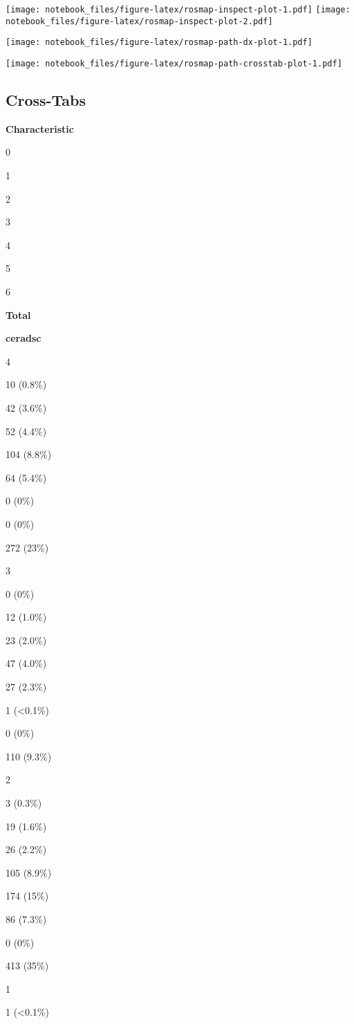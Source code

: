 \documentclass[]{book}
\begin{document}
\texttt{[image: notebook\_files/figure-latex/rosmap-inspect-plot-1.pdf]} \texttt{[image: notebook\_files/figure-latex/rosmap-inspect-plot-2.pdf]}

\texttt{[image: notebook\_files/figure-latex/rosmap-path-dx-plot-1.pdf]}

\texttt{[image: notebook\_files/figure-latex/rosmap-path-crosstab-plot-1.pdf]}

\hypertarget{cross-tabs-1}{%
\subsection{Cross-Tabs}\label{cross-tabs-1}}

\textbf{Characteristic}

0

1

2

3

4

5

6

\textbf{Total}

\textbf{ceradsc}

4

10 (0.8\%)

42 (3.6\%)

52 (4.4\%)

104 (8.8\%)

64 (5.4\%)

0 (0\%)

0 (0\%)

272 (23\%)

3

0 (0\%)

12 (1.0\%)

23 (2.0\%)

47 (4.0\%)

27 (2.3\%)

1 (\textless{}0.1\%)

0 (0\%)

110 (9.3\%)

2

3 (0.3\%)

19 (1.6\%)

26 (2.2\%)

105 (8.9\%)

174 (15\%)

86 (7.3\%)

0 (0\%)

413 (35\%)

1

1 (\textless{}0.1\%)
\end{document}
